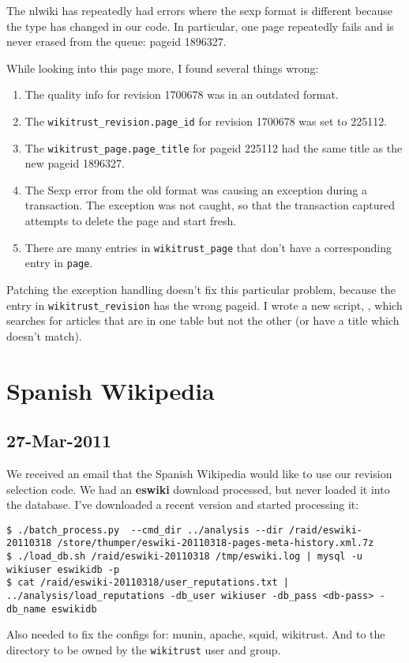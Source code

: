 The nlwiki has repeatedly had errors where the sexp format is
different because the type has changed in our code.
In particular, one page repeatedly fails and is never erased from
the queue: pageid 1896327.

While looking into this page more, I found several things wrong:
\begin{enumerate}
\item The quality info for revision 1700678 was in an outdated format.
\item The \texttt{wikitrust\_revision.page\_id} for revision 1700678 was set
    to 225112.
\item The \texttt{wikitrust\_page.page\_title} for pageid 225112 had the same
    title as the new pageid 1896327.
\item The Sexp error from the old format was causing an exception
    during a transaction.  The exception was not caught, so that the
    transaction captured attempts to delete the page and start fresh.
\item There are many entries in \texttt{wikitrust\_page} that don't have a
    corresponding entry in \texttt{page}.
\end{enumerate}

Patching the exception handling doesn't fix this particular problem,
because the entry in \texttt{wikitrust\_revision} has the wrong pageid.
I wrote a new script, , which searches for
articles that are in one table but not the other (or have a title
which doesn't match).


\section{Spanish Wikipedia}

\subsection{27-Mar-2011}

We received an email that the Spanish Wikipedia would like to use
our revision selection code.
We had an \textbf{eswiki} download processed, but never
loaded it into the database.
I've downloaded a recent version and started processing it:
\begin{verbatim}
$ ./batch_process.py  --cmd_dir ../analysis --dir /raid/eswiki-20110318 /store/thumper/eswiki-20110318-pages-meta-history.xml.7z
$ ./load_db.sh /raid/eswiki-20110318 /tmp/eswiki.log | mysql -u wikiuser eswikidb -p
$ cat /raid/eswiki-20110318/user_reputations.txt | ../analysis/load_reputations -db_user wikiuser -db_pass <db-pass> -db_name eswikidb
\end{verbatim}

Also needed to fix the configs for: munin, apache, squid, wikitrust.
And to  the directory to be owned by the \texttt{wikitrust}
user and group. 


